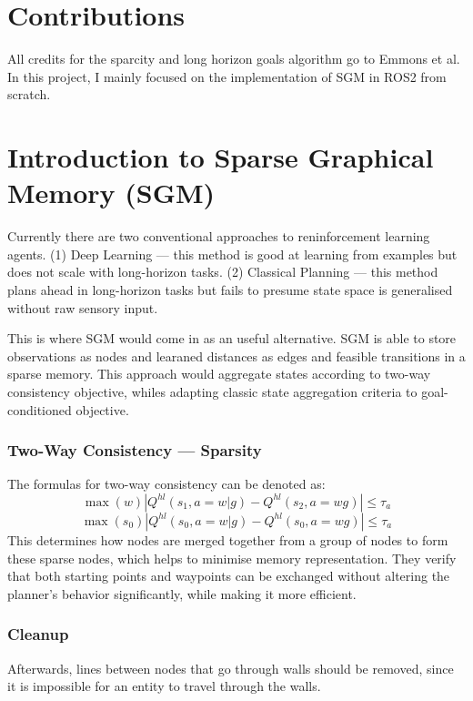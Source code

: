\documentclass[conference]{IEEEtran}
\begin{document}
\section{Contributions}
All credits for the sparcity and long horizon goals algorithm go to Emmons et al. In this project, I mainly focused on the implementation of SGM in ROS2 from scratch.

\section{Introduction to Sparse Graphical Memory (SGM)}

Currently there are two conventional approaches to reninforcement learning agents. (1) Deep Learning --- this method is good at learning from examples but does not scale with long-horizon tasks. (2) Classical Planning --- this method plans ahead in long-horizon tasks but fails to presume state space is generalised without raw sensory input.

This is where SGM would come in as an useful alternative. SGM is able to store observations as nodes and learaned distances as edges and feasible transitions in a sparse memory. This approach would aggregate states according to two-way consistency objective, whiles adapting classic state aggregation criteria to goal-conditioned objective.

\subsubsection{Two-Way Consistency --- Sparsity}
The formulas for two-way consistency can be denoted as:
\begin{equation}
  \max(w) \left| Q^{hl}(s_1, a=w | g) - Q^{hl}(s_2, a=wg) \right| \leq \tau_a
  \label{1}
\end{equation}
\begin{equation}
  \max(s_0) \left| Q^{hl}(s_0, a=w | g) - Q^{hl}(s_0, a=wg) \right| \leq \tau_a
  \label{2}
\end{equation}
This determines how nodes are merged together from a group of nodes to form these sparse nodes, which helps to minimise memory representation. They verify that both starting points and waypoints can be exchanged without altering the planner's behavior significantly, while making it more efficient.

\subsubsection{Cleanup}
Afterwards, lines between nodes that go through walls should be removed, since it is impossible for an entity to travel through the walls.
\end{document}
